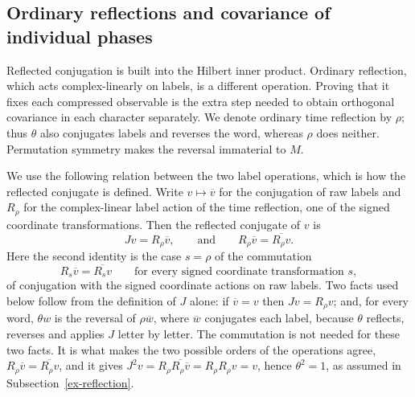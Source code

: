 \subsection{Ordinary reflections and covariance of individual phases}
\label{ex-reflection-transport}

Reflected conjugation is built into the Hilbert inner product. Ordinary
reflection, which acts complex-linearly on labels, is a different
operation. Proving that it fixes each compressed observable is the extra
step needed to obtain orthogonal covariance in each character separately.
We denote ordinary time reflection by \(\rho\); thus \(\theta\)
also conjugates labels and reverses the word, whereas \(\rho\) does
neither. Permutation symmetry makes the reversal immaterial to \(M\).

We use the following relation between the two label operations, which is how
the reflected conjugate is defined. Write \(v\mapsto\overline v\) for the
conjugation of raw labels and \(R_\rho\) for the complex-linear label action
of the time reflection, one of the signed coordinate transformations. Then the
reflected conjugate of \(v\) is
\[
 Jv=R_\rho\overline v,\qquad\text{and}\qquad
 R_\rho\overline v=\overline{R_\rho v}.
\]
Here the second identity is the case \(s=\rho\) of the commutation
\[
 R_s\overline v=\overline{R_sv}
 \qquad\text{for every signed coordinate transformation }s,
\]
of conjugation with the signed coordinate actions on raw labels.
Two facts used below follow from the definition of \(J\) alone: if
\(\overline v=v\) then \(Jv=R_\rho v\); and, for every word, \(\theta w\)
is the reversal of \(\rho\overline w\), where \(\overline w\) conjugates
each label, because \(\theta\) reflects, reverses and applies \(J\) letter
by letter. The commutation is not needed for these two facts. It is what
makes the two possible orders of the operations agree,
\(R_\rho\overline v=\overline{R_\rho v}\), and it gives
\(J^2v=R_\rho\overline{R_\rho\overline v}=R_\rho R_\rho v=v\), hence
\(\theta^2=1\), as assumed in Subsection~\ref{ex-reflection}.

